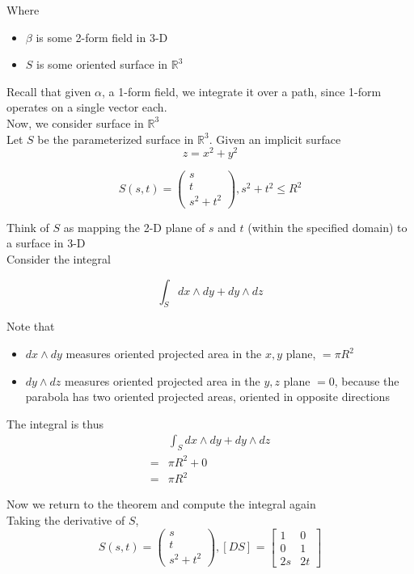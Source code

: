 Where 
\begin{itemize}
   \item $\beta$ is some 2-form field in 3-D
   \item $S$ is some oriented surface in $\mathbb{R}^3$
\end{itemize}

Recall that given $\alpha$, a 1-form field, we integrate it over a path, since 1-form operates on a single vector each. \\

Now, we consider surface in $\mathbb{R}^3$ \\

Let $S$ be the parameterized surface in $\mathbb{R}^3$. Given an implicit surface 
\[
  z = x^2 + y^2
\] 

\[
  S(s, t) = \begin{pmatrix} s \\ t \\ s^2 + t^2 \end{pmatrix}, s^2 + t^2 \leq R^2
\] 

Think of $S$ as mapping the 2-D plane of $s$ and $t$ (within the specified domain)  to a surface in 3-D \\

Consider the integral

\[
  \int_{S}^{} dx \wedge dy + dy \wedge dz 
\] 

Note that 
\begin{itemize}
   \item $dx \wedge dy$ measures oriented projected area in the $x, y$ plane, $= \pi R^2$
   \item $dy \wedge dz$ measures oriented projected area in the $y, z$ plane  $= 0$, because the parabola has two oriented projected areas, oriented in opposite directions
\end{itemize}

The integral is thus
\begin{align*}
   &\int_{S}^{} dx \wedge dy + dy \wedge dz  \\
   =& \pi R^2 + 0 \\
   =& \pi R^2
\end{align*}

Now we return to the theorem and compute the integral again \\

Taking the derivative of $S$, 
\[
   S(s, t) = \begin{pmatrix} s \\ t \\ s^2 + t^2 \end{pmatrix} , 
   \left[ D S \right]_{} = \begin{bmatrix} 
      1 & 0 \\ 0 & 1 \\ 2s & 2t  
   \end{bmatrix}
\] 

